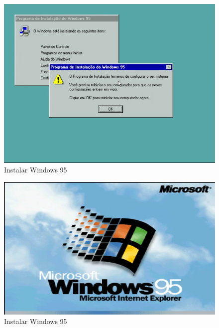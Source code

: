 \documentclass{report}
\begin{document}
\begin{figure}
\centering
\includegraphics[width=\textwidth]{Screenshot_50.png}
\caption{Instalar Windows 95}
\label{fig:50}
\end{figure}

\begin{figure}
\centering
\includegraphics[width=\textwidth]{Screenshot_51.png}
\caption{Instalar Windows 95}
\label{fig:51}
\end{figure}
\end{document}
